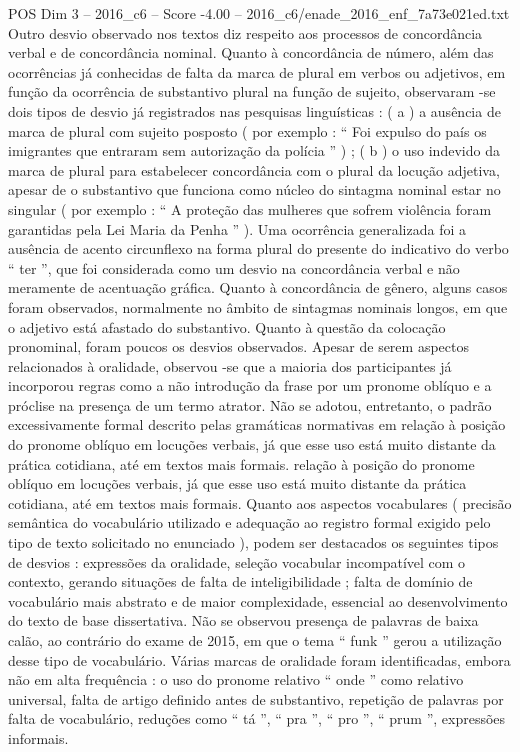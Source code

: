 \begin{textsample}{POS Dim 3 – 2016\_c6 – Score -4.00 – 2016\_c6/enade\_2016\_enf\_7a73e021ed.txt}
Outro desvio observado nos textos diz respeito aos processos de concordância verbal e de concordância nominal.
Quanto à concordância de número, além das ocorrências já conhecidas de falta da marca de plural em verbos ou adjetivos, em função da ocorrência de substantivo plural na função de sujeito, observaram -se dois tipos de desvio já registrados nas pesquisas linguísticas : ( a ) a ausência de marca de plural com sujeito posposto ( por exemplo : “ Foi expulso do país os imigrantes que entraram sem autorização da polícia ” ) ; ( b ) o uso indevido da marca de plural para estabelecer concordância com o plural da locução adjetiva, apesar de o substantivo que funciona como núcleo do sintagma nominal estar no singular ( por exemplo : “ A proteção das mulheres que sofrem violência foram garantidas pela Lei Maria da Penha ” ).
Uma ocorrência generalizada foi a ausência de acento circunflexo na forma plural do presente do indicativo do verbo “ ter ”, que foi considerada como um desvio na concordância verbal e não meramente de acentuação gráfica.
Quanto à concordância de gênero, alguns casos foram observados, normalmente no âmbito de sintagmas nominais longos, em que o adjetivo está afastado do substantivo.
Quanto à questão da colocação pronominal, foram poucos os desvios observados.
Apesar de serem aspectos relacionados à oralidade, observou -se que a maioria dos participantes já incorporou regras como a não introdução da frase por um pronome oblíquo e a próclise na presença de um termo atrator.
Não se adotou, entretanto, o padrão excessivamente formal descrito pelas gramáticas normativas em relação à posição do pronome oblíquo em locuções verbais, já que esse uso está muito distante da prática cotidiana, até em textos mais formais. relação à posição do pronome oblíquo em locuções verbais, já que esse uso está muito distante da prática cotidiana, até em textos mais formais.
Quanto aos aspectos vocabulares ( precisão semântica do vocabulário utilizado e adequação ao registro formal exigido pelo tipo de texto solicitado no enunciado ), podem ser destacados os seguintes tipos de desvios : expressões da oralidade, seleção vocabular incompatível com o contexto, gerando situações de falta de inteligibilidade ; falta de domínio de vocabulário mais abstrato e de maior complexidade, essencial ao desenvolvimento do texto de base dissertativa.
Não se observou presença de palavras de baixa calão, ao contrário do exame de 2015, em que o tema “ funk ” gerou a utilização desse tipo de vocabulário.
Várias marcas de oralidade foram identificadas, embora não em alta frequência : o uso do pronome relativo “ onde ” como relativo universal, falta de artigo definido antes de substantivo, repetição de palavras por falta de vocabulário, reduções como “ tá ”, “ pra ”, “ pro ”, “ prum ”, expressões informais.

\end{textsample}
